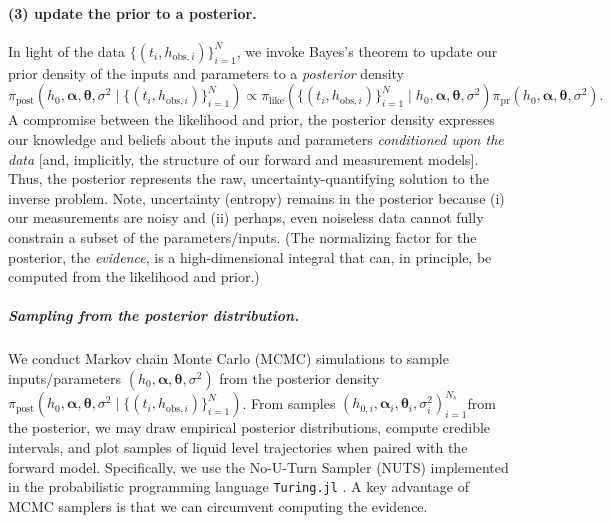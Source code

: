 \documentclass[openacc]{rsproca_new}%
\newcommand\thedata {$\{(t_i,h_{\text{obs}, i})\}_{i=1}^{N}$\xspace}
\newcommand\thedatanomath {\{(t_i,h_{\text{obs}, i})\}_{i=1}^{N}}
\newcommand\thesamples{$(h_{0, i}, \boldsymbol \alpha_i, \boldsymbol \theta_i, \sigma_i^2)_{i=1}^{N_s}$}
\begin{document}
\vspace{-\baselineskip}
\paragraph{(3) update the prior to a posterior.}
In light of the data \thedata, we invoke Bayes's theorem  \cite{van2021bayesian,calvetti2018inverse} to update our prior density of the inputs and parameters to a \emph{posterior} density
\begin{equation}
	\pi_{\text{post}}(h_0, \boldsymbol \alpha, \boldsymbol \theta, \sigma^2 \mid \thedatanomath) \propto %
	\pi_{\text{like}}(\thedatanomath \mid h_0,  \boldsymbol \alpha, \boldsymbol \theta, \sigma^2 ) 
	\pi_{\text{pr}}(h_0, \boldsymbol\alpha, \boldsymbol \theta, \sigma^2).
	 \label{eq:post}
\end{equation} 
A compromise between the likelihood and prior,
the posterior density expresses our knowledge and beliefs about the inputs and parameters \emph{conditioned upon the data} [and, implicitly, the structure of our forward and measurement models]. 
Thus, the posterior represents the raw, uncertainty-quantifying solution to the inverse problem.
Note, uncertainty (entropy) remains in the posterior because
 (i) our measurements are noisy and 
 (ii) perhaps, even noiseless data cannot fully constrain a subset of the parameters/inputs.
(The normalizing factor for the posterior, the \emph{evidence}, is a high-dimensional integral that can, in principle, be computed from the likelihood and prior.)



\vspace{-\baselineskip}
\subparagraph{Sampling from the posterior distribution.} 
We conduct Markov chain Monte Carlo (MCMC) simulations \cite{robert1999monte,van2021bayesian} to sample inputs/parameters $(h_0, \boldsymbol \alpha, \boldsymbol \theta, \sigma^2 )$ from the posterior density $\pi_{\text{post}}(h_0, \boldsymbol \alpha, \boldsymbol \theta, \sigma^2 \mid \thedatanomath)$. 
From samples \thesamples from the posterior, we may draw empirical posterior distributions, compute credible intervals, and plot samples of liquid level trajectories when paired with the forward model.
Specifically, we use the No-U-Turn Sampler (NUTS) \cite{hoffman2014no} implemented in the probabilistic programming language \cite{gordon2014probabilistic} \texttt{Turing.jl} \cite{ge2018turing}.
A key advantage of MCMC samplers is that we can circumvent computing the evidence. 
\end{document}
